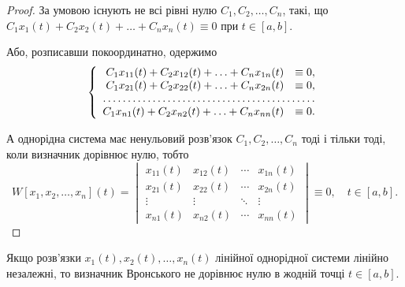 \begin{proof}
	За умовою існують не всі рівні нулю $C_1, C_2, \ldots, C_n$, такі, що $C_1 x_1(t) + C_2 x_2(t) + \ldots + C_n x_n(t) \equiv 0$ при $t \in [a, b]$. \parvskip

	Або, розписавши покоординатно, одержимо
	\begin{equation*}
		\left\{
			\begin{array}{rl}
				C_1 x_{11}(t) + C_2 x_{12}(t) + \ldots + C_n x_{1n}(t) &\equiv 0, \\
				C_1 x_{21}(t) + C_2 x_{22}(t) + \ldots + C_n x_{2n}(t) &\equiv 0, \\
				\hdotsfor{2} \\
				C_1 x_{n1}(t) + C_2 x_{n2}(t) + \ldots + C_n x_{nn}(t) &\equiv 0.
			\end{array}
		\right.
	\end{equation*}

	А однорідна система має ненульовий розв'язок $C_1, C_2, \ldots, C_n$ тоді і тільки тоді, коли визначник дорівнює нулю, тобто
	\begin{equation*}
		W[x_1, x_2, \ldots, x_n](t) = \begin{vmatrix} x_{11}(t) & x_{12}(t) & \cdots & x_{1n}(t) \\ x_{21}(t) & x_{22}(t) & \cdots & x_{2n}(t) \\ \vdots & \vdots & \ddots & \vdots \\ x_{n1}(t) & x_{n2}(t) & \cdots & x_{nn}(t) \end{vmatrix} \equiv 0, \quad t \in [a, b].
	\end{equation*}
\end{proof}

\begin{theorem}
	Якщо розв'язки $x_1(t), x_2(t), \ldots, x_n(t)$ лінійної однорідної системи лінійно незалежні, то визначник Вронського не дорівнює нулю в жодній точці $t \in [a, b]$. 
\end{theorem}

